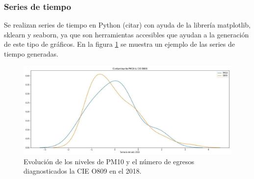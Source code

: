 \subsubsection{Series de tiempo}
Se realizan series de tiempo en Python (citar) con ayuda de la librería matplotlib, sklearn y seaborn, ya que son herramientas accesibles que ayudan a la generación de este tipo de gráficos. 
En la figura \ref{serie_de_tiempo} se muestra un ejemplo de las series de tiempo generadas.
\begin{figure}[h!]
\setcounter{figure}{0} %
\captionsetup{type=figure} %
\begin{center}
   \includegraphics[width=1.1\textwidth]{PM10_O809_2018.eps}
   \end{center}
    \caption{Evolución de los niveles de PM10 y el número de egresos diagnosticados la CIE O809 en el 2018.}
    \label{serie_de_tiempo}
\end{figure}

